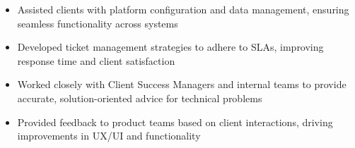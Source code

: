 \par\bigskip
{}
\par\smallskip
\begin{minipage}{13.75cm}
  \begin{minipage}{6.5cm}
    \begin{itemize}
      \item Assisted clients with platform configuration and data management, ensuring seamless functionality across systems
      \item Developed ticket management strategies to adhere to SLAs, improving response time and client satisfaction
    \end{itemize}
  \end{minipage}
  \hfill
  \begin{minipage}{6.5cm}
    \begin{itemize}
      \item Worked closely with Client Success Managers and internal teams to provide accurate, solution-oriented advice for technical problems
      \item Provided feedback to product teams based on client interactions, driving improvements in UX/UI and functionality
    \end{itemize}
  \end{minipage}
\end{minipage}
\par\smallskip
\divider

